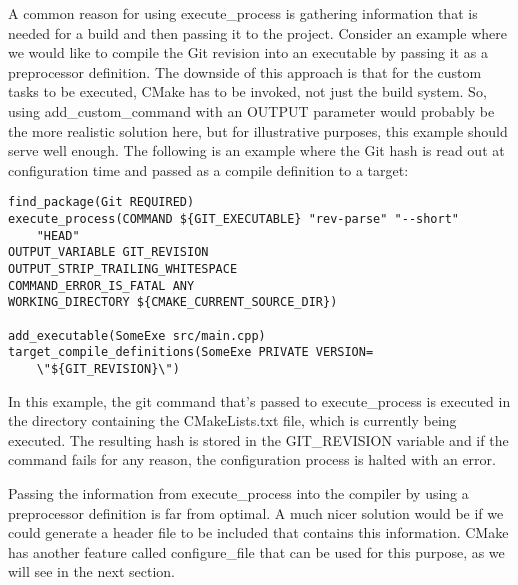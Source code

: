 A common reason for using execute\_process is gathering information that is needed for a build and then passing it to the project. Consider an example where we would like to compile the Git revision into an executable by passing it as a preprocessor definition. The downside of this approach is that for the custom tasks to be executed, CMake has to be invoked, not just the build system. So, using add\_custom\_command with an OUTPUT parameter would probably be the more realistic solution here, but for illustrative purposes, this example should serve well enough. The following is an example where the Git hash is read out at configuration time and passed as a compile definition to a target:

\begin{lstlisting}[style=styleCMake]
find_package(Git REQUIRED)
execute_process(COMMAND ${GIT_EXECUTABLE} "rev-parse" "--short"
	"HEAD"
OUTPUT_VARIABLE GIT_REVISION
OUTPUT_STRIP_TRAILING_WHITESPACE
COMMAND_ERROR_IS_FATAL ANY
WORKING_DIRECTORY ${CMAKE_CURRENT_SOURCE_DIR})

add_executable(SomeExe src/main.cpp)
target_compile_definitions(SomeExe PRIVATE VERSION=
	\"${GIT_REVISION}\")
\end{lstlisting}

In this example, the git command that's passed to execute\_process is executed in the directory containing the CMakeLists.txt file, which is currently being executed. The resulting hash is stored in the GIT\_REVISION variable and if the command fails for any reason, the configuration process is halted with an error.

Passing the information from execute\_process into the compiler by using a preprocessor definition is far from optimal. A much nicer solution would be if we could generate a header file to be included that contains this information. CMake has another feature called configure\_file that can be used for this purpose, as we will see in the next section.

















